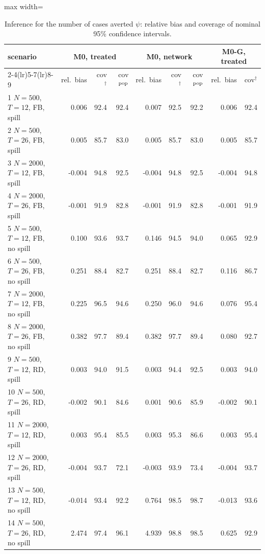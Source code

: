 \begin{table}[!t]
\centering
\caption{Inference for the number of cases averted $\psi$: relative bias and coverage of nominal 95\% confidence intervals.}
\label{tab:sim-psi}
\footnotesize
\setlength{\tabcolsep}{3.5pt}
\begin{adjustbox}{max width=\linewidth}
\begin{tabular}{lrrrrrrrr}
\toprule
scenario & \multicolumn{3}{c}{M0, treated} & \multicolumn{3}{c}{M0, network} & \multicolumn{2}{c}{M0-G, treated} \\
\cmidrule(lr){2-4}\cmidrule(lr){5-7}\cmidrule(lr){8-9}
 & rel.\ bias & cov$^\dagger$ & cov$^{\rm pop}$ & rel.\ bias & cov$^\dagger$ & cov$^{\rm pop}$ & rel.\ bias & cov$^\dagger$ \\
\midrule
1 $N=500$, $T=12$, FB, spill & 0.006 & 92.4 & 92.4 & 0.007 & 92.5 & 92.2 & 0.006 & 92.4 \\
2 $N=500$, $T=26$, FB, spill & 0.005 & 85.7 & 83.0 & 0.005 & 85.7 & 83.0 & 0.005 & 85.7 \\
3 $N=2000$, $T=12$, FB, spill & -0.004 & 94.8 & 92.5 & -0.004 & 94.8 & 92.5 & -0.004 & 94.8 \\
4 $N=2000$, $T=26$, FB, spill & -0.001 & 91.9 & 82.8 & -0.001 & 91.9 & 82.8 & -0.001 & 91.9 \\
5 $N=500$, $T=12$, FB, no spill & 0.100 & 93.6 & 93.7 & 0.146 & 94.5 & 94.0 & 0.065 & 92.9 \\
6 $N=500$, $T=26$, FB, no spill & 0.251 & 88.4 & 82.7 & 0.251 & 88.4 & 82.7 & 0.116 & 86.7 \\
7 $N=2000$, $T=12$, FB, no spill & 0.225 & 96.5 & 94.6 & 0.250 & 96.0 & 94.6 & 0.076 & 95.4 \\
8 $N=2000$, $T=26$, FB, no spill & 0.382 & 97.7 & 89.4 & 0.382 & 97.7 & 89.4 & 0.080 & 92.7 \\
9 $N=500$, $T=12$, RD, spill & 0.003 & 94.0 & 91.5 & 0.003 & 94.4 & 92.5 & 0.003 & 94.0 \\
10 $N=500$, $T=26$, RD, spill & -0.002 & 90.1 & 84.6 & 0.001 & 90.6 & 85.9 & -0.002 & 90.1 \\
11 $N=2000$, $T=12$, RD, spill & 0.003 & 95.4 & 85.5 & 0.003 & 95.3 & 86.6 & 0.003 & 95.4 \\
12 $N=2000$, $T=26$, RD, spill & -0.004 & 93.7 & 72.1 & -0.003 & 93.9 & 73.4 & -0.004 & 93.7 \\
13 $N=500$, $T=12$, RD, no spill & -0.014 & 93.4 & 92.2 & 0.764 & 98.5 & 98.7 & -0.013 & 93.6 \\
14 $N=500$, $T=26$, RD, no spill & 2.474 & 97.4 & 96.1 & 4.939 & 98.8 & 98.5 & 0.625 & 92.9 \\

\end{tabular}
\end{adjustbox}
\end{table}

